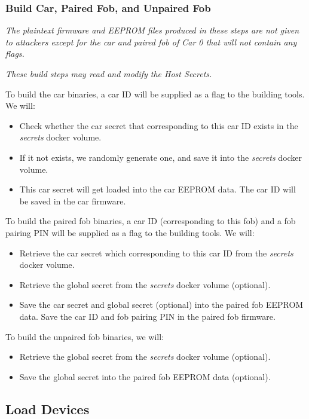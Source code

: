 \documentclass[11pt,oneside,onecolumn,letterpaper]{article}
\begin{document}
\subsubsection{Build Car, Paired Fob, and Unpaired Fob}

\textit{The plaintext firmware and EEPROM files produced in these steps are not given to attackers except for the car and paired fob of Car 0 that will not contain any flags.}

\textit{These build steps may read and modify the Host Secrets.}

To build the car binaries, a car ID will be supplied as a flag to the building tools. We will:
\begin{itemize}
	\item Check whether the car secret that corresponding to this car ID exists in the \textit{secrets} docker volume.
	\item If it not exists, we randomly generate one, and save it into the \textit{secrets} docker volume.
	\item This car secret will get loaded into the car EEPROM data. The car ID will be saved in the car firmware.
\end{itemize}

To build the paired fob binaries, a car ID (corresponding to this fob) and a fob pairing PIN will be supplied as a flag to the building tools. We will:
\begin{itemize}
	\item Retrieve the car secret which corresponding to this car ID from the \textit{secrets} docker volume.
	\item Retrieve the global secret from the \textit{secrets} docker volume (optional).
	\item Save the car secret and global secret (optional) into the paired fob EEPROM data. Save the car ID and fob pairing PIN in the paired fob firmware.
\end{itemize}

To build the unpaired fob binaries, we will:
\begin{itemize}
	\item Retrieve the global secret from the \textit{secrets} docker volume (optional).
	\item Save the global secret into the paired fob EEPROM data (optional).
\end{itemize}

\subsection{Load Devices}
\end{document}
